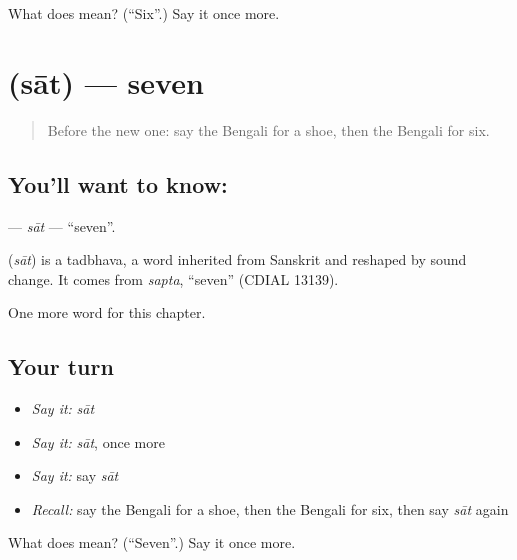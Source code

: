 \begin{tcolorbox}[breakable,colback=teal!4,colframe=teal!35!black,title={Before you move on}]
What does  mean? (\textquotedblleft{}Six\textquotedblright{}.) Say it once more.
\end{tcolorbox}
\section[\texorpdfstring{\bn{সাত} (sāt)}{সাত (sāt)}]{ (sāt) — seven}

\label{lesson:BN-C86-sat}



\begin{quote}
Before the new one: say the Bengali for a shoe, then the Bengali for six.
\end{quote}

\subsection*{You'll want to know: }
\textbf{} — \emph{sāt} — \textquotedblleft{}seven\textquotedblright{}.

\begin{cousinweb}
\textbf{} (\emph{sāt}) is a tadbhava, a word inherited from Sanskrit and reshaped by sound change. It comes from \emph{sapta}, \textquotedblleft{}seven\textquotedblright{} (CDIAL 13139).
\end{cousinweb}

\begin{grammarlens}[title={What you've built}]
One more word for this chapter.
\end{grammarlens}

\subsection*{Your turn}
\begin{itemize}
\raggedright
  \item \emph{Say it:} \emph{sāt}
  \item \emph{Say it:} \emph{sāt}, once more
  \item \emph{Say it:} say \emph{sāt}
  \item \emph{Recall:} say the Bengali for a shoe, then the Bengali for six, then say \emph{sāt} again
\end{itemize}

\begin{tcolorbox}[breakable,colback=teal!4,colframe=teal!35!black,title={Before you move on}]
What does  mean? (\textquotedblleft{}Seven\textquotedblright{}.) Say it once more.
\end{tcolorbox}
